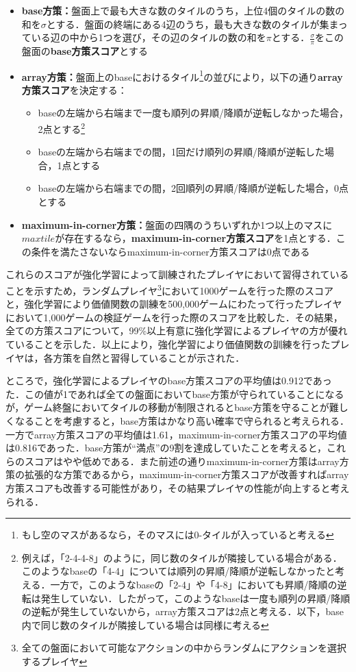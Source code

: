 \documentclass{suribt}
\begin{document}
\begin{itemize}
\item \textbf{base方策：}盤面上で最も大きな数のタイルのうち，上位4個のタイルの数の和を${\sigma}$とする．盤面の終端にある4辺のうち，最も大きな数のタイルが集まっている辺の中から1つを選び，その辺のタイルの数の和を${\pi}$とする．$\displaystyle \frac{\sigma}{\pi}$をこの盤面の\textbf{base方策スコア}とする
\item \textbf{array方策：}盤面上のbaseにおけるタイル\footnote{もし空のマスがあるなら，そのマスには0-タイルが入っていると考える}の並びにより，以下の通り\textbf{array方策スコア}を決定する：
\begin{itemize}
\item baseの左端から右端まで一度も順列の昇順/降順が逆転しなかった場合，2点とする\footnote{例えば，「2-4-4-8」のように，同じ数のタイルが隣接している場合がある．このようなbaseの「4-4」については順列の昇順/降順が逆転しなかったと考える．一方で，このようなbaseの「2-4」や「4-8」においても昇順/降順の逆転は発生していない．したがって，このようなbaseは一度も順列の昇順/降順の逆転が発生していないから，array方策スコアは2点と考える．以下，base内で同じ数のタイルが隣接している場合は同様に考える}
\item baseの左端から右端までの間，1回だけ順列の昇順/降順が逆転した場合，1点とする
\item baseの左端から右端までの間，2回順列の昇順/降順が逆転した場合，0点とする
\end{itemize}
\item \textbf{maximum-in-corner方策：}盤面の四隅のうちいずれか1つ以上のマスに$maxtile$が存在するなら，\textbf{maximum-in-corner方策スコア}を1点とする．この条件を満たさないならmaximum-in-corner方策スコアは0点である
\end{itemize}

これらのスコアが強化学習によって訓練されたプレイヤにおいて習得されていることを示すため，ランダムプレイヤ\footnote{全ての盤面において可能なアクションの中からランダムにアクションを選択するプレイヤ}において1000ゲームを行った際のスコアと，強化学習により価値関数の訓練を500,000ゲームにわたって行ったプレイヤにおいて1,000ゲームの検証ゲームを行った際のスコアを比較した．その結果，全ての方策スコアについて，99\%以上有意に強化学習によるプレイヤの方が優れていることを示した．以上により，強化学習により価値関数の訓練を行ったプレイヤは，各方策を自然と習得していることが示された．

ところで，強化学習によるプレイヤのbase方策スコアの平均値は0.912であった．この値が1であれば全ての盤面においてbase方策が守られていることになるが，ゲーム終盤においてタイルの移動が制限されるとbase方策を守ることが難しくなることを考慮すると，base方策はかなり高い確率で守られると考えられる．一方でarray方策スコアの平均値は1.61，maximum-in-corner方策スコアの平均値は0.816であった．base方策が“満点”の9割を達成していたことを考えると，これらのスコアはやや低めである．また前述の通りmaximum-in-corner方策はarray方策の拡張的な方策であるから，maximum-in-corner方策スコアが改善すればarray方策スコアも改善する可能性があり，その結果プレイヤの性能が向上すると考えられる．
\end{document}
